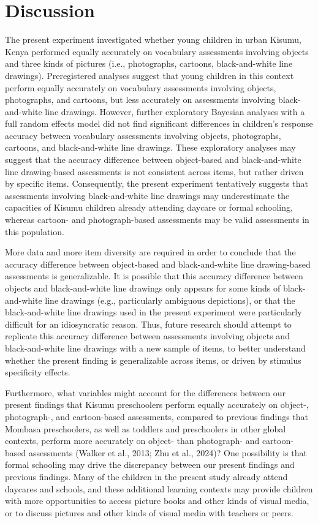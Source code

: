 \documentclass[10pt, letterpaper]{article}
\begin{document}
\section{Discussion}\label{discussion}

The present experiment investigated whether young children in urban
Kisumu, Kenya performed equally accurately on vocabulary assessments
involving objects and three kinds of pictures (i.e., photographs,
cartoons, black-and-white line drawings). Preregistered analyses suggest
that young children in this context perform equally accurately on
vocabulary assessments involving objects, photographs, and cartoons, but
less accurately on assessments involving black-and-white line drawings.
However, further exploratory Bayesian analyses with a full random
effects model did not find significant differences in children's
response accuracy between vocabulary assessments involving objects,
photographs, cartoons, and black-and-white line drawings. These
exploratory analyses may suggest that the accuracy difference between
object-based and black-and-white line drawing-based assessments is not
consistent across items, but rather driven by specific items.
Consequently, the present experiment tentatively suggests that
assessments involving black-and-white line drawings may underestimate
the capacities of Kisumu children already attending daycare or formal
schooling, whereas cartoon- and photograph-based assessments may be
valid assessments in this population.

More data and more item diversity are required in order to conclude that
the accuracy difference between object-based and black-and-white line
drawing-based assessments is generalizable. It is possible that this
accuracy difference between objects and black-and-white line drawings
only appears for some kinds of black-and-white line drawings (e.g.,
particularly ambiguous depictions), or that the black-and-white line
drawings used in the present experiment were particularly difficult for
an idiosyncratic reason. Thus, future research should attempt to
replicate this accuracy difference between assessments involving objects
and black-and-white line drawings with a new sample of items, to better
understand whether the present finding is generalizable across items, or
driven by stimulus specificity effects.

Furthermore, what variables might account for the differences between
our present findings that Kisumu preschoolers perform equally accurately
on object-, photograph-, and cartoon-based assessments, compared to
previous findings that Mombasa preschoolers, as well as toddlers and
preschoolers in other global contexts, perform more accurately on
object- than photograph- and cartoon-based assessments (Walker et al.,
2013; Zhu et al., 2024)? One possibility is that formal schooling may
drive the discrepancy between our present findings and previous
findings. Many of the children in the present study already attend
daycares and schools, and these additional learning contexts may provide
children with more opportunities to access picture books and other kinds
of visual media, or to discuss pictures and other kinds of visual media
with teachers or peers.
\end{document}
